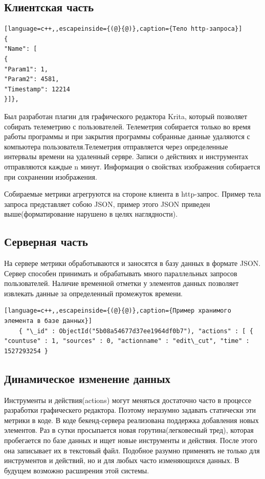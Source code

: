 \subsection{Клиентская часть}
\begin{lstlisting}[language=c++,,escapeinside={(@}{@)},caption={Тело http-запроса}] 
{
"Name": [
{
"Param1": 1,
"Param2": 4581,
"Timestamp": 12214
}]},
\end{lstlisting}
Был разработан плагин для графического редактора Krita, который позво­ляет собирать телеметрию с пользователей. Телеметрия собирается только во время работы программы и при закрытия программы собранные данные удаляются с компьютера пользователя.Телеметрия отправляется через опре­деленные интервалы времени на удаленный сервре. Записи о действиях и инстру­ментах отправляются каждые n минут.	   Информация о свойствах изображения собирается при сохранении изображения. 


Собираемые метрики агрегруются на стороне клиента в http-запрос. Пример тела запроса представляет собою JSON, пример этого JSON приведен выше(форматирование нарушено в целях наглядности).

\subsection{Серверная часть}
На сервере метрики обработываются и заносятся в базу данных в формате JSON. Сервер способен принимать и обрабатывать много параллельных запросов пользователей.
Наличие временной отметки  у элементов данных позволяет извлекать данные за определенный промежуток времени.
	\begin{lstlisting}[language=c++,,escapeinside={(@}{@)},caption={Пример хранимого элемента в базе данных}] 
	{ "\_id" : ObjectId("5b08a54677d37ee1964df0b7"), "actions" : [ { "countuse" : 1, "sources" : 0, "actionname" : "edit\_cut", "time" : 1527293254 }
	\end{lstlisting}

\subsection{Динамическое изменение данных}
Инструменты и действия(actions) могут меняться достаточно часто в про­цессе разработки графическего редактора. Поэтому неразумно задавать статически
эти метрики в коде. В коде бекенд-сервера реализована поддержка добавления но­вых элементов. Раз в сутки просыпается новая горутина(легковесный тред), которая пробегается по базе данных и ищет новые инструменты и действия. После этого она записывает их в текстовый файл. Подобное разумно применять не только для инструментов и действий, но и для любых часто изменяющихся данных.  В будущем возможно расширения этой системы.